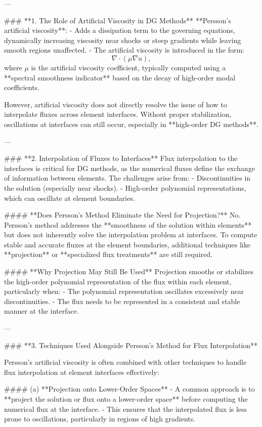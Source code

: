 ---

### **1. The Role of Artificial Viscosity in DG Methods**
**Persson’s artificial viscosity**:
- Adds a dissipation term to the governing equations, dynamically increasing viscosity near shocks or steep gradients while leaving smooth regions unaffected.
- The artificial viscosity is introduced in the form:
  \[
  \nabla \cdot (\mu \nabla u),
  \]
  where \(\mu\) is the artificial viscosity coefficient, typically computed using a **spectral smoothness indicator** based on the decay of high-order modal coefficients.

However, artificial viscosity does not directly resolve the issue of how to interpolate fluxes across element interfaces. Without proper stabilization, oscillations at interfaces can still occur, especially in **high-order DG methods**.

---

### **2. Interpolation of Fluxes to Interfaces**
Flux interpolation to the interfaces is critical for DG methods, as the numerical fluxes define the exchange of information between elements. The challenges arise from:
- Discontinuities in the solution (especially near shocks).
- High-order polynomial representations, which can oscillate at element boundaries.

#### **Does Persson's Method Eliminate the Need for Projection?**
No. Persson's method addresses the **smoothness of the solution within elements** but does not inherently solve the interpolation problem at interfaces. To compute stable and accurate fluxes at the element boundaries, additional techniques like **projection** or **specialized flux treatments** are still required.

#### **Why Projection May Still Be Used**
Projection smooths or stabilizes the high-order polynomial representation of the flux within each element, particularly when:
- The polynomial representation oscillates excessively near discontinuities.
- The flux needs to be represented in a consistent and stable manner at the interface.

---

### **3. Techniques Used Alongside Persson’s Method for Flux Interpolation**

Persson's artificial viscosity is often combined with other techniques to handle flux interpolation at element interfaces effectively:

#### (a) **Projection onto Lower-Order Spaces**
- A common approach is to **project the solution or flux onto a lower-order space** before computing the numerical flux at the interface.
- This ensures that the interpolated flux is less prone to oscillations, particularly in regions of high gradients.

